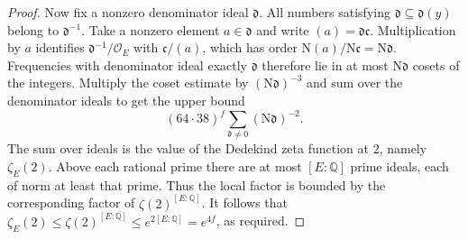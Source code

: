 \begin{proof}
Now fix a nonzero denominator ideal $\mathfrak d$.
All numbers satisfying $\mathfrak d\subseteq\mathfrak d(y)$ belong to $\mathfrak d^{-1}$.
Take a nonzero element $a\in\mathfrak d$ and write $(a)=\mathfrak d\mathfrak c$.
Multiplication by $a$ identifies $\mathfrak d^{-1}/\mathcal O_E$ with $\mathfrak c/(a)$,
which has order $\mathrm N(a)/\mathrm N\mathfrak c=\mathrm N\mathfrak d$.
Frequencies with denominator ideal exactly $\mathfrak d$ therefore lie in at most $\mathrm N\mathfrak d$ cosets of the integers.
Multiply the coset estimate by $(\mathrm N\mathfrak d)^{-3}$ and sum over the denominator ideals to get the upper bound
\[
 (64\cdot38)^f
      \sum_{\mathfrak d\ne0}(\mathrm N\mathfrak d)^{-2}.
\]
The sum over ideals is the value of the Dedekind zeta function at $2$, namely $\zeta_E(2)$.
Above each rational prime there are at most $[E:\mathbb Q]$ prime ideals, each of norm at least that prime.
Thus the local factor is bounded by the corresponding factor of $\zeta(2)^{[E:\mathbb Q]}$.
It follows that $\zeta_E(2)\le\zeta(2)^{[E:\mathbb Q]}\le e^{2[E:\mathbb Q]}=e^{4f}$,
as required.
\end{proof}

